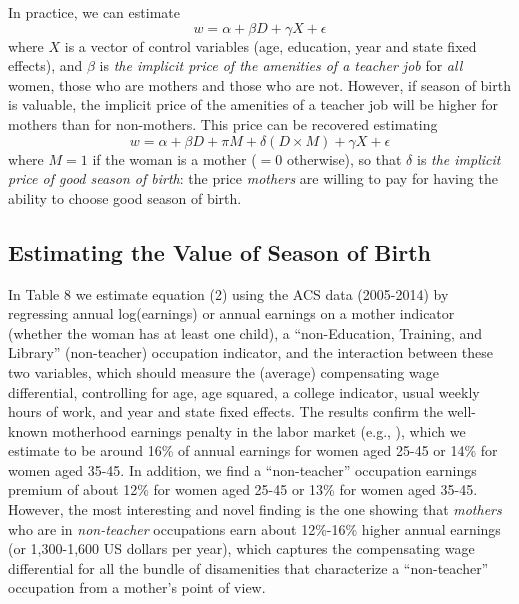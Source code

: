\documentclass[a4paper, 11.5 pt]{article}
\theoremstyle{plain}
\begin{document}
\begin{doublespace}
In practice, we can estimate
\begin{equation}
w = \alpha + \beta D +  \gamma X +  \epsilon
\end{equation}
where $X$ is a vector of control variables (age, education, year and state fixed effects), and $\beta$ is \emph{the implicit price of the amenities of a teacher job} for \emph{all} women, those who are mothers and those who are not. However, if season of birth is valuable, the implicit price of the amenities of a teacher job will be higher for mothers than for non-mothers. This price can be recovered estimating
\begin{equation}
w = \alpha + \beta D + \pi M + \delta (D \times M) + \gamma X +  \epsilon
\end{equation}
where $M=1$ if the woman is a mother ($=0$ otherwise), so that $\delta$ is \emph{the implicit price of good season of birth}: the price \emph{mothers} are willing to pay for having the ability to choose good season of birth.


\subsection{Estimating the Value of Season of Birth}
In Table 8 we estimate equation (2) using the ACS data (2005-2014) by regressing annual log(earnings) or annual earnings on a mother indicator (whether the woman has at least one child), a ``non-Education, Training, and Library'' (non-teacher) occupation indicator, and the interaction between these two variables, which should measure the (average) compensating wage differential, controlling for age, age squared, a college indicator, usual weekly hours of work, and year and state fixed effects. The results confirm the well-known motherhood earnings penalty in the labor market (e.g., \citet{Waldfogel98}), which we estimate to be around 16\% of annual earnings for women aged 25-45 or 14\% for women aged 35-45. In addition, we find a ``non-teacher'' occupation earnings premium of about 12\% for women aged 25-45 or 13\% for women aged 35-45. However, the most interesting and novel finding is the one showing that \emph{mothers} who are in \emph{non-teacher} occupations earn about 12\%-16\% higher annual earnings (or 1,300-1,600 US dollars per year), which captures the compensating wage differential for all the bundle of disamenities that characterize a ``non-teacher'' occupation from a mother's point of view.

\newpage




\end{doublespace}
\end{document}
